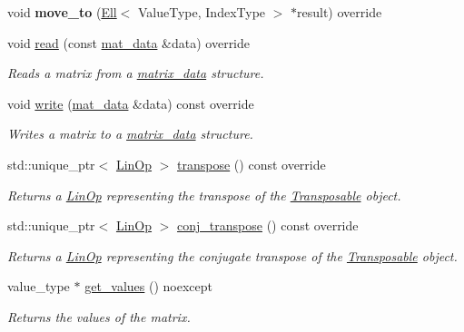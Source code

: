 \begin{DoxyCompactItemize}
\mbox{\label{classgko_1_1matrix_1_1Csr_a44c064ee29e926fe36c8298b7f435242}} 
void {\bfseries move\+\_\+to} (\hyperlink{classgko_1_1matrix_1_1Ell}{Ell}$<$ Value\+Type, Index\+Type $>$ $\ast$result) override
\item 
void \hyperlink{classgko_1_1matrix_1_1Csr_ac4db41146ed3c3a8653b03d6b2c6c675}{read} (const \hyperlink{structgko_1_1matrix__data}{mat\+\_\+data} \&data) override
\begin{DoxyCompactList}\small\item\em Reads a matrix from a \hyperlink{structgko_1_1matrix__data}{matrix\+\_\+data} structure. \end{DoxyCompactList}\item 
void \hyperlink{classgko_1_1matrix_1_1Csr_a205fc391f4cf4f7718a55b0a61f62bc9}{write} (\hyperlink{structgko_1_1matrix__data}{mat\+\_\+data} \&data) const override
\begin{DoxyCompactList}\small\item\em Writes a matrix to a \hyperlink{structgko_1_1matrix__data}{matrix\+\_\+data} structure. \end{DoxyCompactList}\item 
std\+::unique\+\_\+ptr$<$ \hyperlink{classgko_1_1LinOp}{Lin\+Op} $>$ \hyperlink{classgko_1_1matrix_1_1Csr_ab79e609214d6b4834d5961ee0a7d3519}{transpose} () const override
\begin{DoxyCompactList}\small\item\em Returns a \hyperlink{classgko_1_1LinOp}{Lin\+Op} representing the transpose of the \hyperlink{classgko_1_1Transposable}{Transposable} object. \end{DoxyCompactList}\item 
std\+::unique\+\_\+ptr$<$ \hyperlink{classgko_1_1LinOp}{Lin\+Op} $>$ \hyperlink{classgko_1_1matrix_1_1Csr_a38820451af5424f18b767667f3067d72}{conj\+\_\+transpose} () const override
\begin{DoxyCompactList}\small\item\em Returns a \hyperlink{classgko_1_1LinOp}{Lin\+Op} representing the conjugate transpose of the \hyperlink{classgko_1_1Transposable}{Transposable} object. \end{DoxyCompactList}\item 
value\+\_\+type $\ast$ \hyperlink{classgko_1_1matrix_1_1Csr_a929b0a194e6aeb1252b8e6781d162e83}{get\+\_\+values} () noexcept
\begin{DoxyCompactList}\small\item\em Returns the values of the matrix. \end{DoxyCompactList}\item 

\end{DoxyCompactItemize}
